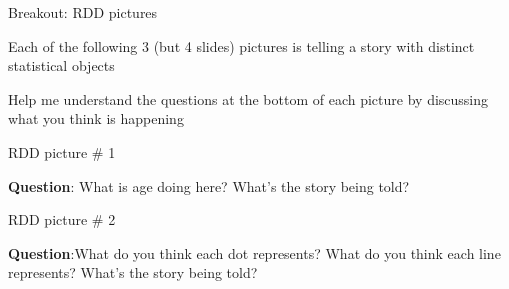 \documentclass{beamer}
\begin{document}
\begin{frame}{Breakout: RDD pictures}

 Each of the following 3 (but 4 slides) pictures is telling a story with distinct statistical objects

\bigskip

Help me understand the questions at the bottom of each picture by discussing what you think is happening


\end{frame}




\begin{frame}{RDD picture \# 1}
	
	\begin{figure}
	\end{figure}

\textbf{Question}: What is age doing here? What's the story being told?

\end{frame}

	
	
\begin{frame}{RDD picture \# 2}
	
	\begin{figure}
	\end{figure}

\textbf{Question}:What do you think each dot represents? What do you think each line represents? What's the story being told?
	
	
\end{frame}
\end{document}
